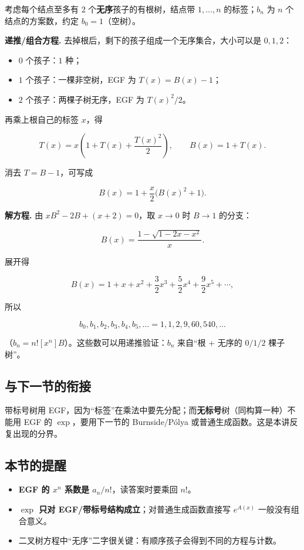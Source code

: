 考虑每个结点至多有 $2$ 个\textbf{无序}孩子的有根树，结点带 $1,\dots,n$ 的标签；$b_n$ 为 $n$ 个结点的方案数，约定 $b_0=1$（空树）。

\textbf{递推/组合方程.} 去掉根后，剩下的孩子组成一个无序集合，大小可以是 $0,1,2$：

\begin{itemize}
\item $0$ 个孩子：$1$ 种；
\item $1$ 个孩子：一棵非空树，EGF 为 $T(x)=B(x)-1$；
\item $2$ 个孩子：两棵子树无序，EGF 为 $T(x)^2/2$。
\end{itemize}


再乘上根自己的标签 $x$，得

\[
T(x)=x\left(1+T(x)+\frac{T(x)^2}{2}\right),\qquad B(x)=1+T(x).
\]

消去 $T=B-1$，可写成

\[
B(x)=1+\frac{x}{2}\bigl(B(x)^2+1\bigr).
\]

\textbf{解方程.} 由 $xB^2-2B+(x+2)=0$，取 $x\to0$ 时 $B\to1$ 的分支：

\[
B(x)=\frac{1-\sqrt{1-2x-x^2}}{x}.
\]

展开得

\[
B(x)=1+x+x^2+\frac{3}{2}x^3+\frac{5}{2}x^4+\frac{9}{2}x^5+\cdots,
\]

所以

\[
b_0,b_1,b_2,b_3,b_4,b_5,\dots=1,1,2,9,60,540,\dots
\]

（$b_n=n![x^n]B$）。这些数可以用递推验证：$b_n$ 来自“根 + 无序的 $0/1/2$ 棵子树”。

\subsection{与下一节的衔接}


带标号树用 EGF，因为“标签”在乘法中要先分配；而\textbf{无标号}树（同构算一种）不能用 EGF 的 $\exp$，要用下一节的 Burnside/Pólya 或普通生成函数。这是本讲反复出现的分界。

\subsection{本节的提醒}


\begin{itemize}
\item \textbf{EGF 的 $x^n$ 系数是 $a_n/n!$}，读答案时要乘回 $n!$。
\item \textbf{$\exp$ 只对 EGF/带标号结构成立}；对普通生成函数直接写 $e^{A(x)}$ 一般没有组合意义。
\item 二叉树方程中“无序”二字很关键：有顺序孩子会得到不同的方程与计数。
\end{itemize}
